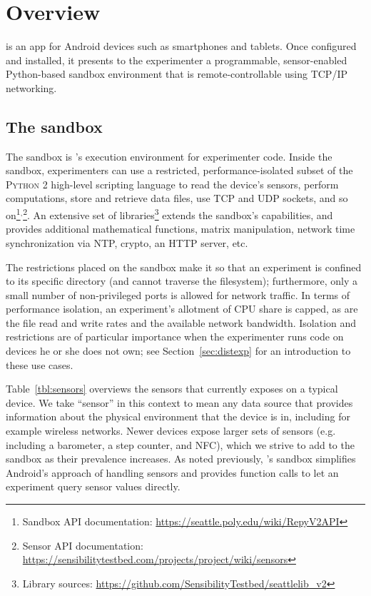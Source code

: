\section{Overview}\label{sec:design}

\sys is an app for Android devices such as smartphones and tablets. 
Once configured and installed, it presents to the experimenter a 
programmable, sensor-enabled Python-based sandbox environment that 
is remote-controllable using TCP/IP networking.


\subsection{The \sys sandbox}

The sandbox is \sys's execution environment for experimenter code. 
Inside the sandbox, experimenters can use a restricted, performance-isolated 
subset of the \textsc{Python 2} high-level scripting language to 
read the device's sensors, perform computations, 
store and retrieve data files, use TCP and UDP sockets, and so 
on\footnote{Sandbox API documentation: \url{https://seattle.poly.edu/wiki/RepyV2API}}$^,$\footnote{Sensor API documentation: \url{https://sensibilitytestbed.com/projects/project/wiki/sensors}}. 
An extensive set of libraries\footnote{Library sources: \url{https://github.com/SensibilityTestbed/seattlelib_v2}} extends the sandbox's 
capabilities, and 
provides additional mathematical functions, matrix manipulation, 
network time synchronization via NTP, crypto, an HTTP server, etc.

The restrictions placed on the sandbox make it so that an experiment 
is confined to its specific directory (and cannot traverse the filesystem); 
furthermore, only a small number of non-privileged ports is allowed for 
network traffic. In terms of performance isolation, an experiment's 
allotment of CPU share is capped, as are the file read and write rates 
and the available network bandwidth.
Isolation and restrictions are of particular importance when the 
experimenter runs code on devices he or she does not own; see 
Section~\ref{sec:distexp} for an introduction to these use cases.



Table~\ref{tbl:sensors} overviews the sensors that \sys currently 
exposes on a typical device. We take ``sensor'' in this context to mean 
any data source that provides information about the physical environment 
that the device is in, including for example wireless networks. 
Newer devices expose larger sets of sensors (e.g. including a 
barometer, a step counter, and NFC), which we strive to add to the 
sandbox as their prevalence increases. 
As noted previously, \sys's sandbox simplifies Android's approach of 
handling sensors and provides function calls to let an experiment 
query sensor values directly.

